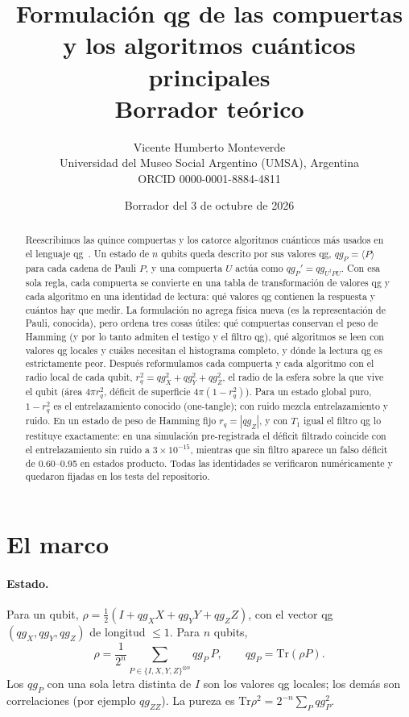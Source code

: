 \documentclass[11pt]{article}
\title{Formulación qg de las compuertas y los algoritmos cuánticos principales\\
\large Borrador teórico}
\author{Vicente Humberto Monteverde\\
\small Universidad del Museo Social Argentino (UMSA), Argentina\\
\small ORCID 0000-0001-8884-4811}
\date{\small Borrador del 3 de octubre de 2026}
\newcommand{\q}[1]{qg_{#1}}
\newcommand{\qZ}{qg_Z}
\newcommand{\qX}{qg_X}
\newcommand{\qY}{qg_Y}
\begin{document}
\sloppy
\maketitle

\begin{abstract}
Reescribimos las quince compuertas y los catorce algoritmos cuánticos más usados en el lenguaje
qg~\cite{monteverde2026qang}. Un estado de $n$ qubits queda descrito por sus valores qg, $\q{P}=\langle P\rangle$
para cada cadena de Pauli $P$, y una compuerta $U$ actúa como $\q{P}'=\q{U^\dagger PU}$. Con esa sola
regla, cada compuerta se convierte en una tabla de transformación de valores qg y cada algoritmo en una
identidad de lectura: qué valores qg contienen la respuesta y cuántos hay que medir. La formulación no
agrega física nueva (es la representación de Pauli, conocida), pero ordena tres cosas útiles: qué
compuertas conservan el peso de Hamming (y por lo tanto admiten el testigo y el filtro qg), qué algoritmos
se leen con valores qg locales y cuáles necesitan el histograma completo, y dónde la lectura qg es
estrictamente peor. Después reformulamos cada compuerta y cada algoritmo con el radio local de cada qubit,
$r_q^2=\qX^2+\qY^2+\qZ^2$, el radio de la esfera sobre la que vive el qubit (área $4\pi r_q^2$, déficit de
superficie $4\pi(1-r_q^2)$). Para un estado global puro, $1-r_q^2$ es el entrelazamiento conocido (one-tangle);
con ruido mezcla entrelazamiento y ruido. En un estado de peso de Hamming fijo $r_q=|\qZ|$, y con $T_1$ igual el
filtro qg lo restituye exactamente: en una simulación pre-registrada el déficit filtrado coincide con el
entrelazamiento sin ruido a $3\times10^{-15}$, mientras que sin filtro aparece un falso déficit de 0.60--0.95 en
estados producto. Todas las identidades se verificaron numéricamente y quedaron fijadas en los tests
del repositorio.
\end{abstract}

\section{El marco}

\paragraph{Estado.} Para un qubit, $\rho=\tfrac12(I+\qX X+\qY Y+\qZ Z)$, con el vector qg
$(\qX,\qY,\qZ)$ de longitud $\le1$. Para $n$ qubits,
\begin{equation}\label{eq:estado}
\rho=\frac{1}{2^n}\sum_{P\in\{I,X,Y,Z\}^{\otimes n}}\q{P}\,P,\qquad \q{P}=\mathrm{Tr}(\rho P).
\end{equation}
Los $\q{P}$ con una sola letra distinta de $I$ son los valores qg locales; los demás son correlaciones
(por ejemplo $\q{ZZ}$). La pureza es $\mathrm{Tr}\rho^2=2^{-n}\sum_P\q{P}^2$.
\end{document}
